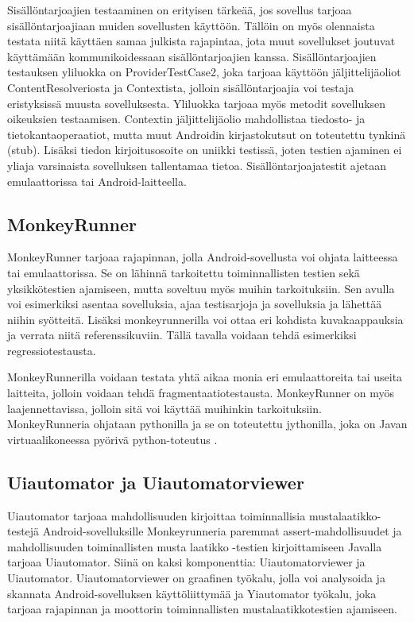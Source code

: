 Sisällöntarjoajien testaaminen on erityisen tärkeää, jos sovellus tarjoaa sisällöntarjoajiaan muiden sovellusten käyttöön. Tällöin on myös olennaista testata niitä käyttäen samaa julkista rajapintaa, jota muut sovellukset joutuvat käyttämään kommunikoidessaan sisällöntarjoajien kanssa. Sisällöntarjoajien testauksen yliluokka on ProviderTestCase2, joka tarjoaa käyttöön jäljittelijäoliot ContentResolveriosta ja Contextista, jolloin sisällöntarjoajia voi testaja eristyksissä muusta sovelluksesta. Yliluokka tarjoaa myös metodit sovelluksen oikeuksien testaamisen. Contextin jäljittelijäolio mahdollistaa tiedosto- ja tietokantaoperaatiot, mutta muut Androidin kirjastokutsut on toteutettu tynkinä (stub). Lisäksi tiedon kirjoitusosoite on uniikki testissä, joten testien ajaminen ei yliaja varsinaista sovelluksen tallentamaa tietoa. Sisällöntarjoajatestit ajetaan emulaattorissa tai Android-laitteella. \cite{android}

\subsection{MonkeyRunner}
\label{monkeyrunner}

MonkeyRunner tarjoaa rajapinnan, jolla Android-sovellusta voi ohjata laitteessa tai emulaattorissa. Se on lähinnä tarkoitettu toiminnallisten testien sekä yksikkötestien ajamiseen, mutta soveltuu myös muihin tarkoituksiin. Sen avulla voi esimerkiksi asentaa sovelluksia, ajaa testisarjoja ja sovelluksia ja lähettää niihin syötteitä. Lisäksi monkeyrunnerilla voi ottaa eri kohdista kuvakaappauksia ja verrata niitä referenssikuviin. Tällä tavalla voidaan tehdä esimerkiksi regressiotestausta.

MonkeyRunnerilla voidaan testata yhtä aikaa monia eri emulaattoreita tai useita laitteita, jolloin voidaan tehdä fragmentaatiotestausta. MonkeyRunner on myös laajennettavissa, jolloin sitä voi käyttää muihinkin tarkoituksiin. MonkeyRunneria ohjataan pythonilla ja se on toteutettu jythonilla, joka on Javan virtuaalikoneessa pyörivä python-toteutus \cite{android}.

\subsection{Uiautomator ja Uiautomatorviewer}

Uiautomator tarjoaa mahdollisuuden kirjoittaa toiminnallisia mustalaatikko-testejä Android-sovelluksille Monkeyrunneria paremmat assert-mahdollisuudet ja mahdollisuuden toiminallisten musta laatikko -testien kirjoittamiseen Javalla tarjoaa Uiautomator. Siinä on kaksi komponenttia: Uiautomatorviewer ja Uiautomator. Uiautomatorviewer on graafinen työkalu, jolla voi analysoida ja skannata Android-sovelluksen käyttöliittymää ja Yiautomator työkalu, joka tarjoaa rajapinnan ja moottorin toiminnallisten mustalaatikkotestien ajamiseen.

